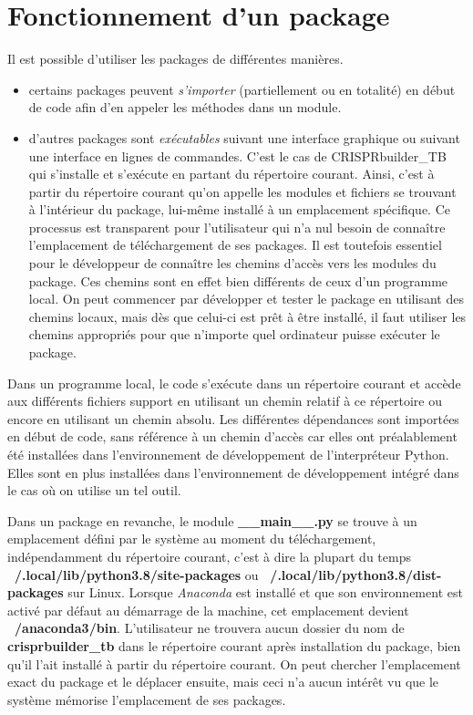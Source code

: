 \documentclass[twoside,a4paper,11pt,frenchb,openany]{report}
\begin{document}
\section{Fonctionnement d'un package}

Il est possible d'utiliser les packages de différentes manières. 
\begin{itemize}
\item certains packages peuvent \textit{s'importer} (partiellement ou en totalité) en début de code afin d'en appeler les méthodes dans un module. 
\item d'autres packages sont \textit{exécutables} suivant une interface graphique ou suivant une interface en lignes de commandes. C'est le cas de CRISPRbuilder\_TB qui s'installe et s'exécute en partant du répertoire courant. Ainsi, c'est à partir du répertoire courant qu'on appelle les modules et fichiers se trouvant à l'intérieur du package, lui-même installé à un emplacement spécifique. Ce processus est transparent pour l'utilisateur qui n'a nul besoin de connaître l'emplacement de téléchargement de ses packages. Il est toutefois essentiel pour le développeur de connaître les chemins d'accès vers les modules du package. Ces chemins sont en effet bien différents de ceux d'un programme local. On peut commencer par développer et tester le package en utilisant des chemins locaux, mais dès que celui-ci est prêt à être installé, il faut utiliser les chemins appropriés pour que n'importe quel ordinateur puisse exécuter le package.
\end{itemize}

Dans un programme local, le code s'exécute dans un répertoire courant et accède aux différents fichiers support en utilisant un chemin relatif à ce répertoire ou encore en utilisant un chemin absolu. Les différentes dépendances sont importées en début de code, sans référence à un chemin d'accès car elles ont préalablement été installées dans l'environnement de développement de l'interpréteur Python. Elles sont en plus installées dans l'environnement de développement intégré dans le cas où on utilise un tel outil.

Dans un package en revanche, le module \textbf{\_\_main\_\_.py} se trouve à un emplacement défini par le système au moment du téléchargement, indépendamment du répertoire courant, c'est à dire la plupart du temps \textbf{~/.local/lib/python3.8/site-packages} ou \textbf{~/.local/lib/python3.8/dist-packages} sur Linux. Lorsque \textit{Anaconda} est installé et que son environnement est activé par défaut au démarrage de la machine, cet emplacement devient \textbf{~/anaconda3/bin}. L'utilisateur ne trouvera aucun dossier du nom de \textbf{crisprbuilder\_tb} dans le répertoire courant après installation du package, bien qu'il l'ait installé à partir du répertoire courant. On peut chercher l'emplacement exact du package et le déplacer ensuite, mais ceci n'a aucun intérêt vu que le système mémorise l'emplacement de ses packages.
\end{document}
